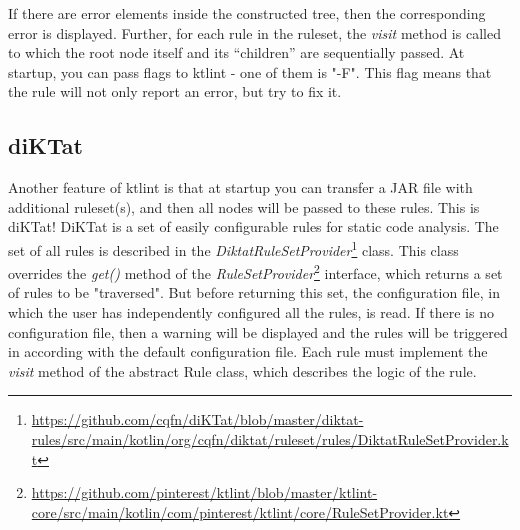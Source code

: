 If there are error elements inside the constructed tree, then the corresponding error is displayed. Further, for each rule in the ruleset, the \textsl{visit} method is called to which the root node itself and its “children” are sequentially passed.
At startup, you can pass flags to ktlint - one of them is "-F". This flag means that the rule will not only report an error, but try to fix it.

\subsection{diKTat}
\par
Another feature of ktlint is that at startup you can transfer a JAR file with additional ruleset(s), and then all nodes will be passed to these rules. This is diKTat! DiKTat is a set of easily configurable rules for static code analysis. 
The set of all rules is described in the \textsl{DiktatRuleSetProvider}\footnote{\url{https://github.com/cqfn/diKTat/blob/master/diktat-rules/src/main/kotlin/org/cqfn/diktat/ruleset/rules/DiktatRuleSetProvider.kt}} class. This class overrides the \textsl{get()} method of the \textsl{RuleSetProvider}\footnote{\url{https://github.com/pinterest/ktlint/blob/master/ktlint-core/src/main/kotlin/com/pinterest/ktlint/core/RuleSetProvider.kt}} interface, which returns a set of rules to be "traversed". But before returning this set, the configuration file, in which the user has independently configured all the rules, is read. If there is no configuration file, then a warning will be displayed and the rules will be triggered in according with the default configuration file. 
Each rule must implement the \textsl{visit} method of the abstract Rule class, which describes the logic of the rule.

